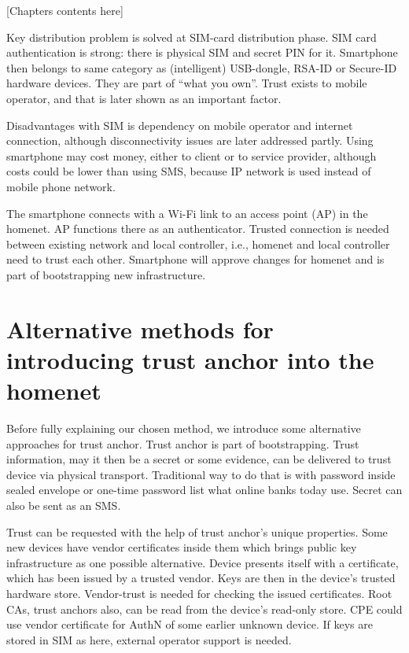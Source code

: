 \documentclass[12pt,a4paper,english]{tutthesis}
\begin{document}
[Chapters contents here]

Key distribution problem is solved at SIM-card distribution phase.
SIM card authentication is strong: there is physical SIM and secret PIN for it.
Smartphone then belongs to same category as (intelligent) USB-dongle,
RSA-ID or Secure-ID hardware devices.  They are part of ``what you own''.
Trust exists to mobile operator, and that is later shown as an
important factor. 



Disadvantages with SIM is dependency on mobile operator and internet
connection, although disconnectivity issues are later addressed partly.
Using smartphone may cost money, either to client or to service
provider, although costs could be lower than using SMS, because 
IP network is used instead of mobile
phone network.


The smartphone connects
 with a Wi-Fi link to an access point (AP) in the homenet.
 AP functions there as an authenticator.
Trusted connection is needed between existing network and local
controller, i.e., homenet and local controller need to trust each other.
Smartphone will approve changes for homenet and is part of bootstrapping
new infrastructure.

\section{Alternative methods for introducing trust anchor into the homenet}
\label{sec-4-1}

Before fully explaining our chosen method, we introduce some
alternative approaches for trust anchor. Trust anchor is part of
bootstrapping. Trust information, may it then be a secret or some
evidence, can be delivered to trust device via physical
transport. Traditional way to do that is with password inside sealed
envelope or one-time password list what online banks today use. Secret
can also be sent as an SMS.

Trust can be requested with the help of trust anchor's unique
 properties. Some new devices have vendor certificates inside them which
brings public key infrastructure as one possible alternative. Device
presents itself with a certificate, which has been issued by a trusted
vendor.  Keys are then in the device's trusted hardware store.
Vendor-trust is needed for checking the issued certificates. Root CAs, 
trust anchors also, can be read from the device's read-only store. 
CPE could use vendor certificate for AuthN of some earlier unknown device.
If keys are stored in SIM as here, external operator support is needed. 
\end{document}
